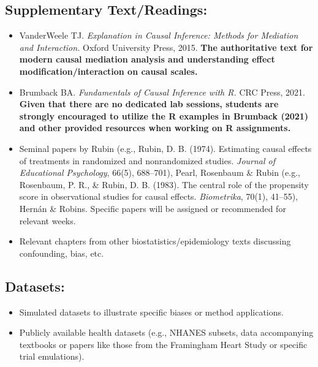 \documentclass[10.5pt]{article}
\begin{document}
\subsection{Supplementary Text/Readings:}
\begin{itemize}
    \item VanderWeele TJ. \textit{Explanation in Causal Inference: Methods for Mediation and Interaction.} Oxford University Press, 2015. \textbf{The authoritative text for modern causal mediation analysis and understanding effect modification/interaction on causal scales.}
    \item Brumback BA. \textit{Fundamentals of Causal Inference with R.} CRC Press, 2021. \textbf{Given that there are no dedicated lab sessions, students are strongly encouraged to utilize the R examples in Brumback (2021) and other provided resources when working on R assignments.}
    \item Seminal papers by Rubin (e.g., Rubin, D. B. (1974). Estimating causal effects of treatments in randomized and nonrandomized studies. \textit{Journal of Educational Psychology}, 66(5), 688–701), Pearl, Rosenbaum \& Rubin (e.g., Rosenbaum, P. R., \& Rubin, D. B. (1983). The central role of the propensity score in observational studies for causal effects. \textit{Biometrika}, 70(1), 41–55), Hernán \& Robins. Specific papers will be assigned or recommended for relevant weeks.
    \item Relevant chapters from other biostatistics/epidemiology texts discussing confounding, bias, etc.
\end{itemize}

\subsection{Datasets:}
\begin{itemize}
    \item Simulated datasets to illustrate specific biases or method applications.
    \item Publicly available health datasets (e.g., NHANES subsets, data accompanying textbooks or papers like those from the Framingham Heart Study or specific trial emulations).
\end{itemize}
\end{document}
